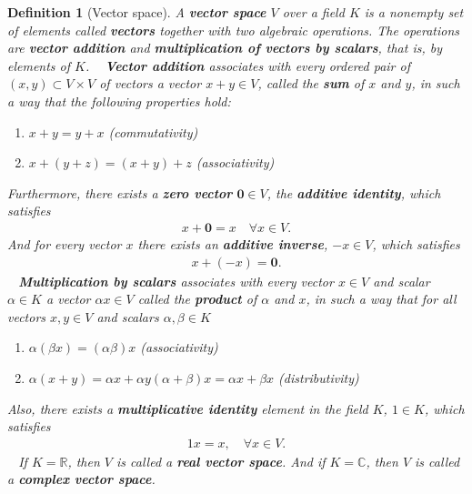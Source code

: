 \documentclass[11pt]{article}
\theoremstyle{mystyle}
\newtheorem{defn}{Definition}[section]
\newcommand{\0}{\mathbf{0}}
\begin{document}
\begin{defn}[Vector space]
A \textbf{vector space} $V$ over a field $K$ is a nonempty set of elements called \textbf{vectors} together with two algebraic operations. The operations are \textbf{vector addition} and \textbf{multiplication of vectors by scalars}, that is, by elements of $K$.\newline
~\newline
\textbf{Vector addition} associates with every ordered pair of $(x, y) \subset V \times V$ of vectors a vector $x + y \in V$, called the \textbf{sum} of $x$ and $y$, in such a way that the following properties hold:
\begin{enumerate}
    \item $x + y = y + x$ \quad (commutativity)
    \item $x + (y + z) = (x + y) + z$  \quad (associativity)
\end{enumerate}
Furthermore, there exists a \textbf{zero vector} $\0 \in V$, the \textbf{additive identity}, which satisfies
\begin{align*}
    x + \0 = x \quad \forall x \in V.
\end{align*}
And for every vector $x$ there exists an \textbf{additive inverse}, $-x \in V$, which satisfies
\begin{align*}
    x + (-x) = \0.
\end{align*}
~\newline
\textbf{Multiplication by scalars} associates with every vector $x \in V$ and scalar $\alpha \in K$ a vector $\alpha x \in V$ called the \textbf{product} of $\alpha$ and $x$, in such a way that for all vectors $x, y \in V$ and scalars $\alpha, \beta \in K$
\begin{enumerate}
    \item $\alpha(\beta x) = (\alpha \beta)x$ \quad (associativity)
    \item $\alpha(x + y) = \alpha x + \alpha y$\newline $(\alpha + \beta)x = \alpha x + \beta x$ \quad (distributivity)
\end{enumerate}
Also, there exists a \textbf{multiplicative identity} element in the field $K$, $1 \in K$, which satisfies
\begin{align*}
    1x = x, \quad \forall x \in V.
\end{align*}
~\newline
If $K = \mathbb{R}$, then $V$ is called a \textbf{real vector space}. And if $K = \mathbb{C}$, then $V$ is called a \textbf{complex vector space}.
\end{defn}
\end{document}
